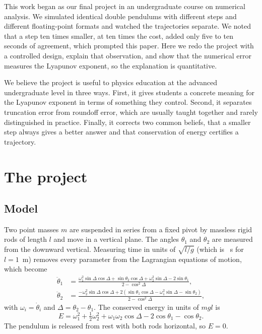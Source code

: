 \documentclass[12pt,a4paper]{article}
\begin{document}
This work began as our final project in an undergraduate course on numerical
analysis. We simulated identical double pendulums with different steps and
different floating-point formats and watched the trajectories separate. We noted
that a step ten times smaller, at ten times the cost, added only five to ten
seconds of agreement, which prompted this paper. Here we redo the project with a
controlled design, explain that observation, and show that the numerical error
measures the Lyapunov exponent, so the explanation is quantitative.

We believe the project is useful to physics education at the advanced
undergraduate level in three ways. First, it gives students a concrete meaning
for the Lyapunov exponent in terms of something they control. Second, it
separates truncation error from roundoff error, which are usually taught
together and rarely distinguished in practice. Finally, it corrects two common
beliefs, that a smaller step always gives a better answer and that conservation
of energy certifies a trajectory.

\section{The project}

\subsection{Model}

Two point masses $m$ are suspended in series from a fixed pivot by massless rigid
rods of length $l$ and move in a vertical plane. The angles $\theta_1$ and
$\theta_2$ are measured from the downward vertical. Measuring time in units of
$\sqrt{l/g}$ (which is \secPerUnit~s for $l=1$~m) removes every parameter from
the Lagrangian equations of motion, which become
\begin{align}
\ddot\theta_1 &= \frac{\omega_1^2\sin\Delta\cos\Delta+\sin\theta_2\cos\Delta
                +\omega_2^2\sin\Delta-2\sin\theta_1}{2-\cos^2\Delta},\label{eq:eom1}\\
\ddot\theta_2 &= \frac{-\omega_2^2\sin\Delta\cos\Delta
                +2\left(\sin\theta_1\cos\Delta-\omega_1^2\sin\Delta-\sin\theta_2\right)}
                {2-\cos^2\Delta},\label{eq:eom2}
\end{align}
with $\omega_i=\dot\theta_i$ and $\Delta=\theta_2-\theta_1$. The conserved energy
in units of $mgl$ is
\begin{equation}
E=\omega_1^2+\tfrac12\omega_2^2+\omega_1\omega_2\cos\Delta-2\cos\theta_1-\cos\theta_2 .
\end{equation}
The pendulum is released from rest with both rods horizontal, so $E=0$.
\end{document}
